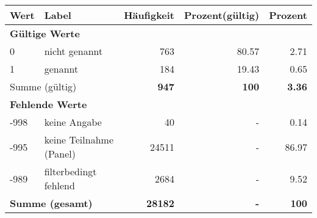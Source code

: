      \begin{longtable}{lXrrr}
     \toprule
     \textbf{Wert} & \textbf{Label} & \textbf{Häufigkeit} & \textbf{Prozent(gültig)} & \textbf{Prozent} \\
     \endhead
     \midrule
     \multicolumn{5}{l}{\textbf{Gültige Werte}}\\

     0 &
     \multicolumn{1}{X}{ nicht genannt   } &


       \num{763} &
       \num[round-mode=places,round-precision=2]{80.57} &
         \num[round-mode=places,round-precision=2]{2.71} \\

     1 &
     \multicolumn{1}{X}{ genannt   } &


       \num{184} &
       \num[round-mode=places,round-precision=2]{19.43} &
         \num[round-mode=places,round-precision=2]{0.65} \\
     \midrule
     \multicolumn{2}{l}{Summe (gültig)} &
       \textbf{\num{947}} &
     \textbf{\num{100}} &
       \textbf{\num[round-mode=places,round-precision=2]{3.36}} \\
     \multicolumn{5}{l}{\textbf{Fehlende Werte}}\\
       -998 &
       keine Angabe &
         \num{40} &
        - &
         \num[round-mode=places,round-precision=2]{0.14} \\
       -995 &
       keine Teilnahme (Panel) &
         \num{24511} &
        - &
         \num[round-mode=places,round-precision=2]{86.97} \\
       -989 &
       filterbedingt fehlend &
         \num{2684} &
        - &
         \num[round-mode=places,round-precision=2]{9.52} \\
     \midrule
     \multicolumn{2}{l}{\textbf{Summe (gesamt)}} &
          \textbf{\num{28182}} &
        \textbf{-} &
        \textbf{\num{100}} \\
     \bottomrule
     \end{longtable}
     
